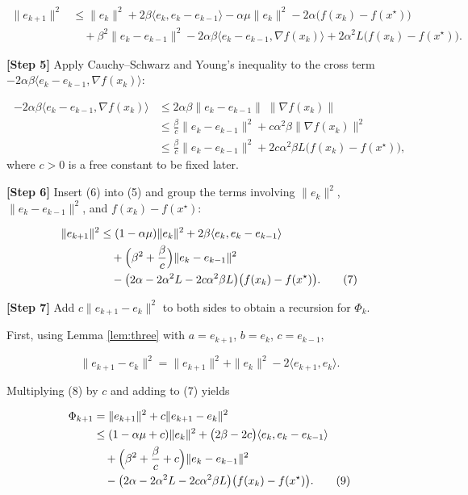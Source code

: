 \documentclass{article}
\begin{document}
\[
\begin{aligned}
\|e_{k+1}\|^{2}
&\le \|e_{k}\|^{2}+2\beta\langle e_{k},e_{k}-e_{k-1}\rangle
   -\alpha\mu\|e_{k}\|^{2}
   -2\alpha\bigl(f(x_{k})-f(x^{\star})\bigr)\\
&\quad+\beta^{2}\|e_{k}-e_{k-1}\|^{2}
   -2\alpha\beta\langle e_{k}-e_{k-1},\nabla f(x_{k})\rangle
   +2\alpha^{2}L\bigl(f(x_{k})-f(x^{\star})\bigr). \tag{5}
\end{aligned}
\]

\noindent\textbf{[Step 5]} Apply Cauchy–Schwarz and Young’s inequality to the cross term 
$-2\alpha\beta\langle e_{k}-e_{k-1},\nabla f(x_{k})\rangle$:

\[
\begin{aligned}
-2\alpha\beta\langle e_{k}-e_{k-1},\nabla f(x_{k})\rangle
&\le 2\alpha\beta\|e_{k}-e_{k-1}\|\;\|\nabla f(x_{k})\|\\
&\le \frac{\beta}{c}\|e_{k}-e_{k-1}\|^{2}
      +c\alpha^{2}\beta\|\nabla f(x_{k})\|^{2} \\
&\le \frac{\beta}{c}\|e_{k}-e_{k-1}\|^{2}
      +2c\alpha^{2}\beta L\bigl(f(x_{k})-f(x^{\star})\bigr), \tag{6}
\end{aligned}
\]
where $c>0$ is a free constant to be fixed later.

\noindent\textbf{[Step 6]} Insert (6) into (5) and group the terms involving $\|e_{k}\|^{2}$, $\|e_{k}-e_{k-1}\|^{2}$, and $f(x_{k})-f(x^{\star})$:

\[
\begin{aligned}
\|e_{k+1}\|^{2}
&\le (1-\alpha\mu)\|e_{k}\|^{2}
   +2\beta\langle e_{k},e_{k}-e_{k-1}\rangle\\
&\quad+ \Bigl(\beta^{2}+\frac{\beta}{c}\Bigr)\|e_{k}-e_{k-1}\|^{2}\\
&\quad-\bigl(2\alpha-2\alpha^{2}L-2c\alpha^{2}\beta L\bigr)\bigl(f(x_{k})-f(x^{\star})\bigr). \tag{7}
\end{aligned}
\]

\noindent\textbf{[Step 7]} Add $c\|e_{k+1}-e_{k}\|^{2}$ to both sides to obtain a recursion for $\Phi_{k}$.

First, using Lemma \ref{lem:three} with $a=e_{k+1}$, $b=e_{k}$, $c=e_{k-1}$,

\[
\|e_{k+1}-e_{k}\|^{2}= \|e_{k+1}\|^{2}+\|e_{k}\|^{2}
   -2\langle e_{k+1},e_{k}\rangle. \tag{8}
\]

Multiplying (8) by $c$ and adding to (7) yields

\[
\begin{aligned}
\Phi_{k+1}
&= \|e_{k+1}\|^{2}+c\|e_{k+1}-e_{k}\|^{2}\\
&\le (1-\alpha\mu +c)\|e_{k}\|^{2}
   +\bigl(2\beta-2c\bigr)\langle e_{k},e_{k}-e_{k-1}\rangle\\
&\quad+ \Bigl(\beta^{2}+\frac{\beta}{c}+c\Bigr)\|e_{k}-e_{k-1}\|^{2}\\
&\quad-\bigl(2\alpha-2\alpha^{2}L-2c\alpha^{2}\beta L\bigr)\bigl(f(x_{k})-f(x^{\star})\bigr). \tag{9}
\end{aligned}
\]
\end{document}
